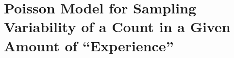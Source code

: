 \documentclass[10pt,handout]{beamer}\usepackage[]{graphicx}\usepackage[]{color}
\begin{document}

\section{Poisson Model for Sampling Variability of a Count in a Given Amount of ``Experience''}
\end{document}
